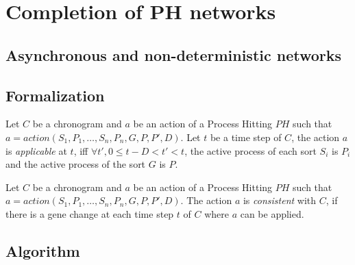 
\section{Completion of PH networks}

\subsection{Asynchronous and non-deterministic networks}

\subsection{Formalization}

\begin{definition}[Applicability]
	Let $C$ be a chronogram and $a$ be an action of a Process Hitting $PH$ such that $a = action(S_1,P_1,\ldots, S_n,P_n, G, P, P', D)$.
	Let $t$ be a time step of $C$, the action $a$ is {\it applicable} at $t$,
	iff $\forall t', 0 \leq t-D < t' < t$, the active process of each sort $S_i$ is $P_i$ and the active process of the sort $G$ is $P$.
\end{definition}


\begin{definition}[Consistency]
	Let $C$ be a chronogram and $a$ be an action of a Process Hitting $PH$ such that $a = action(S_1,P_1,\ldots, S_n,P_n, G, P, P', D)$.
	The action $a$ is {\it consistent} with $C$, if there is a gene change at each time step $t$ of $C$ where $a$ can be applied.
\end{definition}

\subsection{Algorithm}

